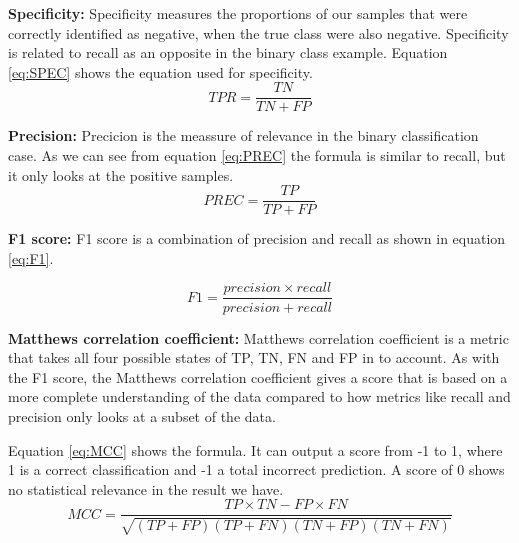 \vspace{5px}
\textbf{Specificity:} Specificity measures the proportions of our samples that were correctly identified as negative, when the true class were also negative. 
Specificity is related to recall as an opposite in the binary class example.
Equation \ref{eq:SPEC} shows the equation used for specificity.
\begin{equation}
TPR=\frac{TN}{TN+FP}
\label{eq:SPEC}
\end{equation}



\vspace{5px}
\textbf{Precision:}
Precicion is the meassure of relevance in the binary classification case.
As we can see from equation \ref{eq:PREC} the formula is similar to recall, but it only looks at the positive samples. 
\begin{equation}
PREC=\frac{TP}{TP+FP}
\label{eq:PREC}
\end{equation}



\vspace{5px}
\textbf{F1 score:}
F1 score is a combination of precision and recall as shown in equation \ref{eq:F1}. 

\begin{equation}
F1=\frac{precision \times recall}{precision + recall}
\label{eq:F1}
\end{equation}



\vspace{5px}
\textbf{Matthews correlation coefficient:}
Matthews correlation coefficient is a metric that takes all four possible states of TP, TN, FN and FP in to account. As with the F1 score, the Matthews correlation coefficient gives a score that is based on a more complete understanding of the data compared to how metrics like recall and precision only looks at a subset of the data.

Equation \ref{eq:MCC} shows the formula. It can output a score from -1 to 1, where 1 is a correct classification and -1 a total incorrect prediction. A score of 0 shows no statistical relevance in the result we have.
\begin{equation}
MCC=\frac{TP \times TN - FP \times FN}{\sqrt{(TP + FP)(TP + FN)(TN + FP)(TN + FN)}}
\label{eq:MCC}
\end{equation}







